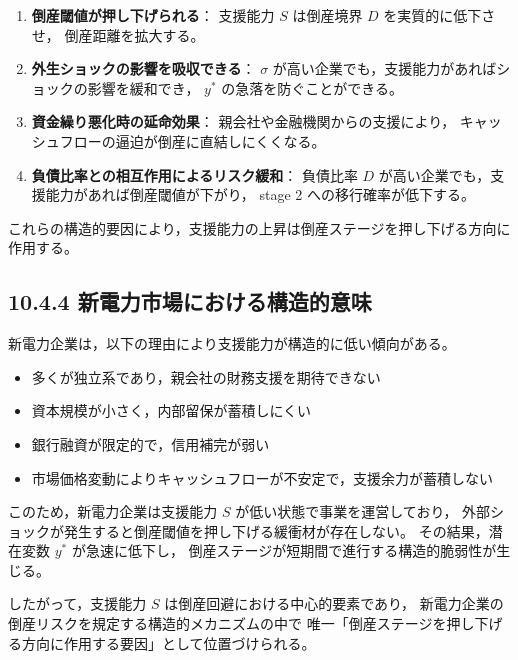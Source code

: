 \begin{enumerate}
    \item \textbf{倒産閾値が押し下げられる}：  
          支援能力 $S$ は倒産境界 $D$ を実質的に低下させ，
          倒産距離を拡大する。

    \item \textbf{外生ショックの影響を吸収できる}：  
          $\sigma$ が高い企業でも，支援能力があればショックの影響を緩和でき，
          $y^*$ の急落を防ぐことができる。

    \item \textbf{資金繰り悪化時の延命効果}：  
          親会社や金融機関からの支援により，
          キャッシュフローの逼迫が倒産に直結しにくくなる。

    \item \textbf{負債比率との相互作用によるリスク緩和}：  
          負債比率 $D$ が高い企業でも，支援能力があれば倒産閾値が下がり，
          stage 2 への移行確率が低下する。
\end{enumerate}

これらの構造的要因により，支援能力の上昇は倒産ステージを押し下げる方向に作用する。

\subsection*{10.4.4 新電力市場における構造的意味}

新電力企業は，以下の理由により支援能力が構造的に低い傾向がある。

\begin{itemize}
    \item 多くが独立系であり，親会社の財務支援を期待できない  
    \item 資本規模が小さく，内部留保が蓄積しにくい  
    \item 銀行融資が限定的で，信用補完が弱い  
    \item 市場価格変動によりキャッシュフローが不安定で，支援余力が蓄積しない  
\end{itemize}

このため，新電力企業は支援能力 $S$ が低い状態で事業を運営しており，
外部ショックが発生すると倒産閾値を押し下げる緩衝材が存在しない。
その結果，潜在変数 $y^*$ が急速に低下し，
倒産ステージが短期間で進行する構造的脆弱性が生じる。

したがって，支援能力 $S$ は倒産回避における中心的要素であり，
新電力企業の倒産リスクを規定する構造的メカニズムの中で
唯一「倒産ステージを押し下げる方向に作用する要因」として位置づけられる。

